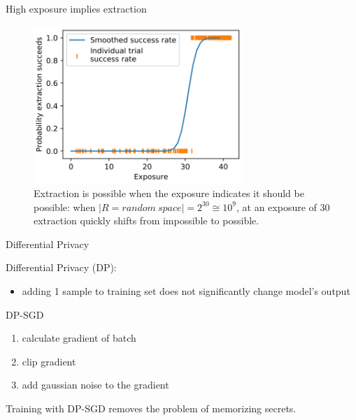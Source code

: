 \documentclass{beamer}
\begin{document}
\begin{frame}{High exposure implies extraction}

\begin{figure}[h]
\includegraphics[width=0.7\textwidth]{img/extraction}
\caption{Extraction is possible when the exposure indicates it should be possible: when $|R=random\ space| = 2^{30} \cong 10^9$, at an exposure of 30 extraction quickly shifts from impossible to possible.}
\end{figure}

\end{frame}
\begin{frame}{Differential Privacy}

Differential Privacy (DP):
\begin{itemize}
\item adding 1 sample to training set does not significantly change model's output 
\end{itemize}

\vfill

DP-SGD \cite{dp}
\begin{enumerate}
\item calculate gradient of batch
\item clip gradient
\item add gaussian noise to the gradient
\end{enumerate}

\vfill

Training with DP-SGD removes the problem of memorizing secrets.

\end{frame}
\end{document}
